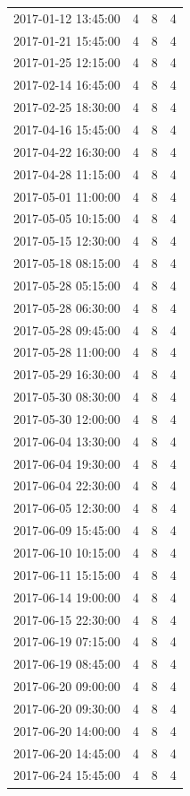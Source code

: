 \begin{tabular}{lrrr}
2017-01-12 13:45:00 & 4 & 8 & 4 \\
2017-01-21 15:45:00 & 4 & 8 & 4 \\
2017-01-25 12:15:00 & 4 & 8 & 4 \\
2017-02-14 16:45:00 & 4 & 8 & 4 \\
2017-02-25 18:30:00 & 4 & 8 & 4 \\
2017-04-16 15:45:00 & 4 & 8 & 4 \\
2017-04-22 16:30:00 & 4 & 8 & 4 \\
2017-04-28 11:15:00 & 4 & 8 & 4 \\
2017-05-01 11:00:00 & 4 & 8 & 4 \\
2017-05-05 10:15:00 & 4 & 8 & 4 \\
2017-05-15 12:30:00 & 4 & 8 & 4 \\
2017-05-18 08:15:00 & 4 & 8 & 4 \\
2017-05-28 05:15:00 & 4 & 8 & 4 \\
2017-05-28 06:30:00 & 4 & 8 & 4 \\
2017-05-28 09:45:00 & 4 & 8 & 4 \\
2017-05-28 11:00:00 & 4 & 8 & 4 \\
2017-05-29 16:30:00 & 4 & 8 & 4 \\
2017-05-30 08:30:00 & 4 & 8 & 4 \\
2017-05-30 12:00:00 & 4 & 8 & 4 \\
2017-06-04 13:30:00 & 4 & 8 & 4 \\
2017-06-04 19:30:00 & 4 & 8 & 4 \\
2017-06-04 22:30:00 & 4 & 8 & 4 \\
2017-06-05 12:30:00 & 4 & 8 & 4 \\
2017-06-09 15:45:00 & 4 & 8 & 4 \\
2017-06-10 10:15:00 & 4 & 8 & 4 \\
2017-06-11 15:15:00 & 4 & 8 & 4 \\
2017-06-14 19:00:00 & 4 & 8 & 4 \\
2017-06-15 22:30:00 & 4 & 8 & 4 \\
2017-06-19 07:15:00 & 4 & 8 & 4 \\
2017-06-19 08:45:00 & 4 & 8 & 4 \\
2017-06-20 09:00:00 & 4 & 8 & 4 \\
2017-06-20 09:30:00 & 4 & 8 & 4 \\
2017-06-20 14:00:00 & 4 & 8 & 4 \\
2017-06-20 14:45:00 & 4 & 8 & 4 \\
2017-06-24 15:45:00 & 4 & 8 & 4 \\

\end{tabular}
